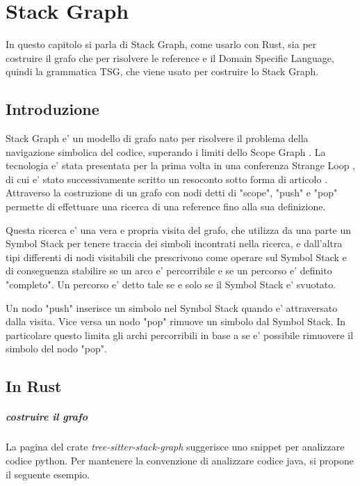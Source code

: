 \chapter{Stack Graph}

In questo capitolo si parla di Stack Graph, come usarlo con Rust, sia per costruire il grafo che per risolvere le reference e il Domain Specific Language, quindi la grammatica TSG, che viene usato per costruire lo Stack Graph.

\section{Introduzione}
Stack Graph \cite{StackGraph} e' un modello di grafo nato per risolvere il problema della navigazione simbolica del codice, superando i limiti dello Scope Graph \cite{ScopeGraph}.
La tecnologia e' stata presentata per la prima volta in una conferenza Strange Loop \cite{StackGraphConference}, di cui e' stato successivamente scritto un resoconto sotto forma di articolo \cite{StackGraphIntro}.
Attraverso la costruzione di un grafo con nodi detti di "scope", "push" e "pop" permette di effettuare una ricerca di una reference fino alla sua definizione.

Questa ricerca e' una vera e propria visita del grafo, che utilizza da una parte un Symbol Stack per tenere traccia dei simboli incontrati nella ricerca, e dall'altra tipi differenti di nodi visitabili che prescrivono come operare sul Symbol Stack e di conseguenza stabilire se un arco e' percorribile e se un percorso e' definito "completo".
Un percorso e' detto tale se e solo se il Symbol Stack e' svuotato.

Un nodo "push" inserisce un simbolo nel Symbol Stack quando e' attraversato dalla visita.
Vice versa un nodo "pop" rimuove un simbolo dal Symbol Stack.
In particolare questo limita gli archi percorribili in base a se e' possibile rimuovere il simbolo del nodo "pop".

\section{In Rust}

\paragraph{costruire il grafo}

La pagina del crate \emph{tree-sitter-stack-graph} \cite{TreeSitterStackGraph} suggerisce uno snippet per analizzare codice python.
Per mantenere la convenzione di analizzare codice java, si propone il seguente esempio.

